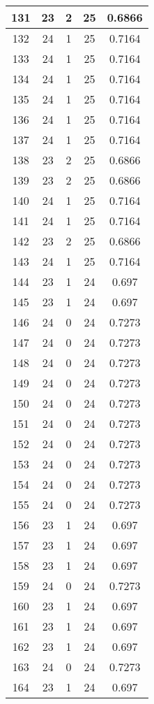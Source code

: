 \documentclass[letterpaper, 12pt]{article}
\begin{document}
\begin{longtable}{|c|c|c|c|c|}
\hline
131 & 23 & 2 & 25 & 0.6866 \\
\hline
132 & 24 & 1 & 25 & 0.7164 \\
\hline
133 & 24 & 1 & 25 & 0.7164 \\
\hline
134 & 24 & 1 & 25 & 0.7164 \\
\hline
135 & 24 & 1 & 25 & 0.7164 \\
\hline
136 & 24 & 1 & 25 & 0.7164 \\
\hline
137 & 24 & 1 & 25 & 0.7164 \\
\hline
138 & 23 & 2 & 25 & 0.6866 \\
\hline
139 & 23 & 2 & 25 & 0.6866 \\
\hline
140 & 24 & 1 & 25 & 0.7164 \\
\hline
141 & 24 & 1 & 25 & 0.7164 \\
\hline
142 & 23 & 2 & 25 & 0.6866 \\
\hline
143 & 24 & 1 & 25 & 0.7164 \\
\hline
144 & 23 & 1 & 24 & 0.697 \\
\hline
145 & 23 & 1 & 24 & 0.697 \\
\hline
146 & 24 & 0 & 24 & 0.7273 \\
\hline
147 & 24 & 0 & 24 & 0.7273 \\
\hline
148 & 24 & 0 & 24 & 0.7273 \\
\hline
149 & 24 & 0 & 24 & 0.7273 \\
\hline
150 & 24 & 0 & 24 & 0.7273 \\
\hline
151 & 24 & 0 & 24 & 0.7273 \\
\hline
152 & 24 & 0 & 24 & 0.7273 \\
\hline
153 & 24 & 0 & 24 & 0.7273 \\
\hline
154 & 24 & 0 & 24 & 0.7273 \\
\hline
155 & 24 & 0 & 24 & 0.7273 \\
\hline
156 & 23 & 1 & 24 & 0.697 \\
\hline
157 & 23 & 1 & 24 & 0.697 \\
\hline
158 & 23 & 1 & 24 & 0.697 \\
\hline
159 & 24 & 0 & 24 & 0.7273 \\
\hline
160 & 23 & 1 & 24 & 0.697 \\
\hline
161 & 23 & 1 & 24 & 0.697 \\
\hline
162 & 23 & 1 & 24 & 0.697 \\
\hline
163 & 24 & 0 & 24 & 0.7273 \\
\hline
164 & 23 & 1 & 24 & 0.697 \\

\end{longtable}
\end{document}
